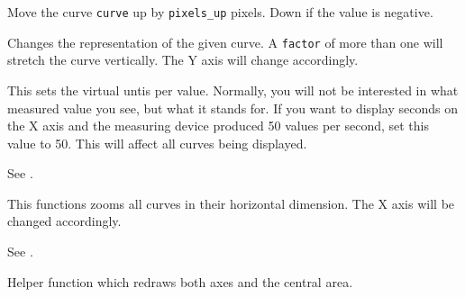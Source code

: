 \label{wxplotwindowmove}


Move the curve {\tt curve} up by {\tt pixels\_up} pixels. Down if the
value is negative.

\label{wxplotwindowenlarge}


Changes the representation of the given curve. A {\tt factor} of more than
one will stretch the curve vertically. The Y axis will change accordingly.

\label{wxplotwindowsetunitspervalue}


This sets the virtual untis per value. Normally, you will not be interested in
what measured value you see, but what it stands for. If you want to display seconds
on the X axis and the measuring device produced 50 values per second, set this
value to 50. This will affect all curves being displayed.

\label{wxplotwindowgetunitspervalue}


See .

\label{wxplotwindowsetzoom}


This functions zooms all curves in their horizontal dimension. The X axis will
be changed accordingly.

\label{wxplotwindowgetzoom}


See .

\label{wxplotwindowredraweverything}


Helper function which redraws both axes and the central area.

\label{wxplotwindowredrawxaxis}

